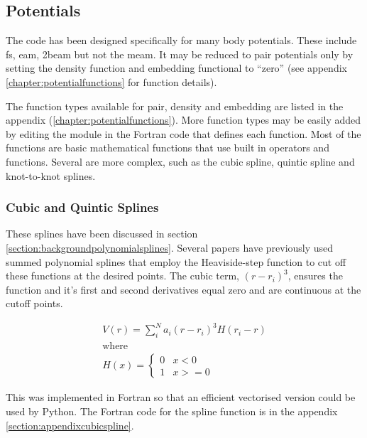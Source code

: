 \subsection{Potentials}

The code has been designed specifically for many body potentials.  These include \acrlong{fs},  \acrlong{eam}, \acrlong{2beam} but not the \acrlong{meam}.  It may be reduced to pair potentials only by setting the density function and embedding functional to \enquote{zero} (see appendix \ref{chapter:potentialfunctions} for function details).  

The function types available for pair, density and embedding are listed in the appendix (\ref{chapter:potentialfunctions}).  More function types may be easily added by editing the module in the Fortran code that defines each function.  Most of the functions are basic mathematical functions that use built in operators and functions.  Several are more complex, such as the cubic spline, quintic spline and knot-to-knot splines.


\subsubsection{Cubic and Quintic Splines}

These splines have been discussed in section \ref{section:backgroundpolynomialsplines}.  Several papers have previously used summed polynomial splines that employ the Heaviside-step function to cut off these functions at the desired points.  The cubic term, $(r - r_i)^3$, ensures the function and it's first and second derivatives equal zero and are continuous at the cutoff points.  

\begin{equation}
\begin{split}
V(r) = \sum_i^N a_i (r - r_i)^3 H(r_i - r) \\
\text{where } \\
H(x) = \left\{ \begin{matrix} 0 & x<0 \\  1 & x >= 0 \end{matrix} \right . 
\end{split}
\label{eq:cubicSpline}
\end{equation}

This was implemented in Fortran so that an efficient vectorised version could be used by Python.  The Fortran code for the spline function is in the appendix \ref{section:appendixcubicspline}.


